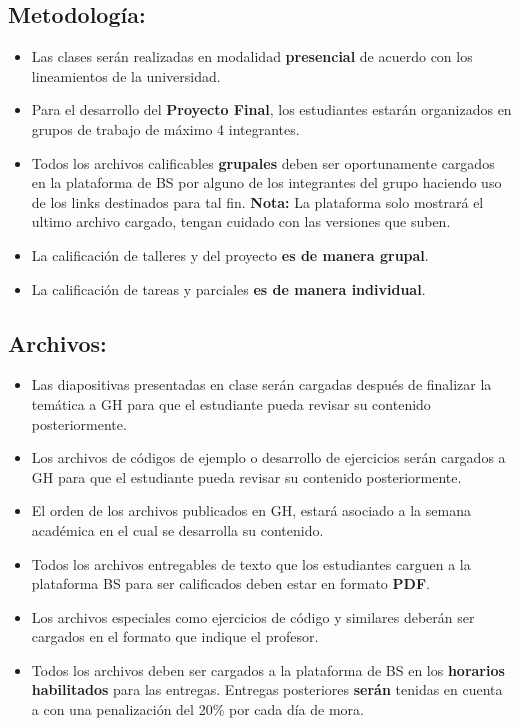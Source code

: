 \documentclass[11pt]{article}
\begin{document}
\subsection{Metodología:}\label{metodologuxeda}
\begin{itemize}
    \item Las clases serán realizadas en modalidad \textbf{presencial} de acuerdo con los lineamientos de la universidad.
    \item Para el desarrollo del \textbf{Proyecto Final}, los estudiantes estarán organizados en grupos de trabajo de máximo 4 integrantes.
    \item Todos los archivos calificables \textbf{grupales} deben ser oportunamente cargados en la plataforma de BS por alguno de los integrantes del grupo haciendo uso de los links destinados para tal fin. \textbf{Nota:} La plataforma solo mostrará el ultimo archivo cargado, tengan cuidado con las versiones que suben.
    \item La calificación de talleres y del proyecto \textbf{es de manera grupal}.
    \item La calificación de tareas y parciales \textbf{es de manera individual}.
\end{itemize}

\subsection{Archivos:}\label{archivos}
\begin{itemize}
    \item Las diapositivas presentadas en clase serán cargadas después de finalizar la temática a GH para que el estudiante pueda revisar su contenido posteriormente.
    \item Los archivos de códigos de ejemplo o desarrollo de ejercicios serán cargados a GH para que el estudiante pueda revisar su contenido posteriormente.
    \item El orden de los archivos publicados en GH, estará asociado a la semana académica en el cual se desarrolla su contenido.
    \item Todos los archivos entregables de texto que los estudiantes carguen a la plataforma BS para ser calificados deben estar en formato \textbf{PDF}.
    \item Los archivos especiales como ejercicios de código y similares deberán ser cargados en el formato que indique el profesor.
    \item Todos los archivos deben ser cargados a la plataforma de BS en los \textbf{horarios habilitados} para las entregas. Entregas posteriores \textbf{serán} tenidas en cuenta a con una penalización del 20\% por cada día de mora.
\end{itemize}
\end{document}
